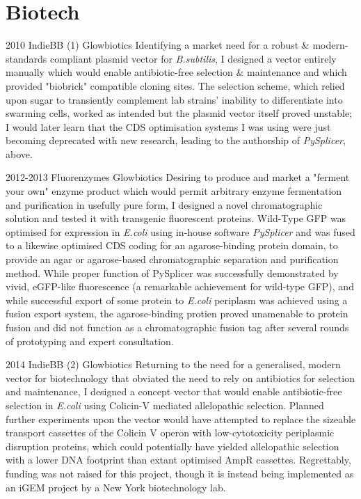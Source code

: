 \documentclass[]{friggeri-cv} %
\begin{document}
\section{Biotech}
\begin{entrylist}
\entry
{2010}
{IndieBB (1)}
{Glowbiotics}
{Identifying a market need for a robust \& modern-standards compliant plasmid vector
for \emph{B.subtilis}, I designed a vector entirely manually which would enable
antibiotic-free selection \& maintenance and which provided "biobrick" compatible
cloning sites. The selection scheme, which relied upon sugar to transiently complement
lab strains' inability to differentiate into swarming cells, worked as intended but
the plasmid vector itself proved unstable; I would later learn that the CDS optimisation
systems I was using were just becoming deprecated with new research, leading to the
authorship of \emph{PySplicer}, above.
}

\entry
{2012-2013}
{Fluorenzymes}
{Glowbiotics}
{Desiring to produce and market a "ferment your own" enzyme product which would permit
arbitrary enzyme fermentation and purification in usefully pure form, I designed a novel
chromatographic solution and tested it with transgenic fluorescent proteins. Wild-Type
GFP was optimised for expression in \emph{E.coli} using in-house software \emph{PySplicer}
and was fused to a likewise optimised CDS coding for an agarose-binding protein domain, to
provide an agar or agarose-based chromatographic separation and purification method.
While proper function of PySplicer was successfully demonstrated by vivid, eGFP-like
fluorescence (a remarkable achievement for wild-type GFP), and while successful export
of some protein to \emph{E.coli} periplasm was achieved using a fusion export system,
the agarose-binding protien proved unamenable to protein fusion and did not function as
a chromatographic fusion tag after several rounds of prototyping and expert consultation.
}

\entry
{2014}
{IndieBB (2)}
{Glowbiotics}
{Returning to the need for a generalised, modern vector for biotechnology that obviated
the need to rely on antibiotics for selection and maintenance, I designed a concept
vector that would enable antibiotic-free selection in \emph{E.coli} using Colicin-V
mediated allelopathic selection. Planned further experiments upon the vector would have
attempted to replace the sizeable transport cassettes of the Colicin V operon with
low-cytotoxicity periplasmic disruption proteins, which could potentially have yielded
allelopathic selection with a lower DNA footprint than extant optimised AmpR cassettes.
Regrettably, funding was not raised for this project, though it is instead being implemented
as an iGEM project by a New York biotechnology lab.
}

\end{entrylist}
\end{document}
